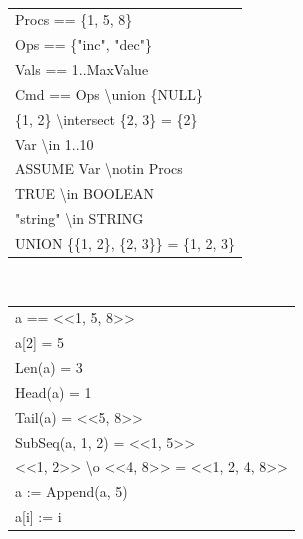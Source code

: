 \documentclass[
  11pt,aspectratio=1610,pdf,hyperref={unicode,colorlinks=false}
]{beamer}
\begin{document}
\begingroup
\renewcommand*{\arraystretch}{1.3}
\def\scmd#1{\textbackslash\relax#1}%
\begin{frame}[t,fragile]
  \vspace{2ex}%
  \strut\\%
  \begin{center}\begin{minipage}{.6\textwidth}
  \begin{tabular}{>{\begingroup\ttfamily\normalsize}l<{\endgroup}}
    Procs == \{1, 5, 8\}                       \\
    Ops == \{"inc", "dec"\}                    \\
    Vals == 1..MaxValue                        \\\pause
    Cmd == Ops \scmd{union} \{NULL\}           \\
    \{1, 2\} \scmd{intersect} \{2, 3\} = \{2\} \\
    Var \scmd{in} 1..10                        \\
    ASSUME Var \scmd{notin} Procs              \\\pause
    TRUE \scmd{in} BOOLEAN                     \\
    "string" \scmd{in} STRING                  \\
    UNION \{\{1, 2\}, \{2, 3\}\} = \{1, 2, 3\}
  \end{tabular}
  \end{minipage}\end{center}
\end{frame}

\begin{frame}[t,fragile]
  \vspace{2ex}%
  \strut\\%
  \begin{center}\begin{minipage}{.6\textwidth}
  \begin{tabular}{>{\begingroup\ttfamily\normalsize}l<{\endgroup}}
    a == <<1, 5, 8>>                           \\
    a[2] = 5                                   \\\pause
    Len(a) = 3                                 \\
    Head(a) = 1                                \\
    Tail(a) = <<5, 8>>                         \\
    SubSeq(a, 1, 2) = <<1, 5>>                 \\\pause
    <<1, 2>> \scmd{o} <<4, 8>> = <<1, 2, 4, 8>>\\
    a := Append(a, 5)                          \\
    a[i] := i                                  \\
  \end{tabular}    
  \end{minipage}\end{center}
\end{frame}
\end{document}
